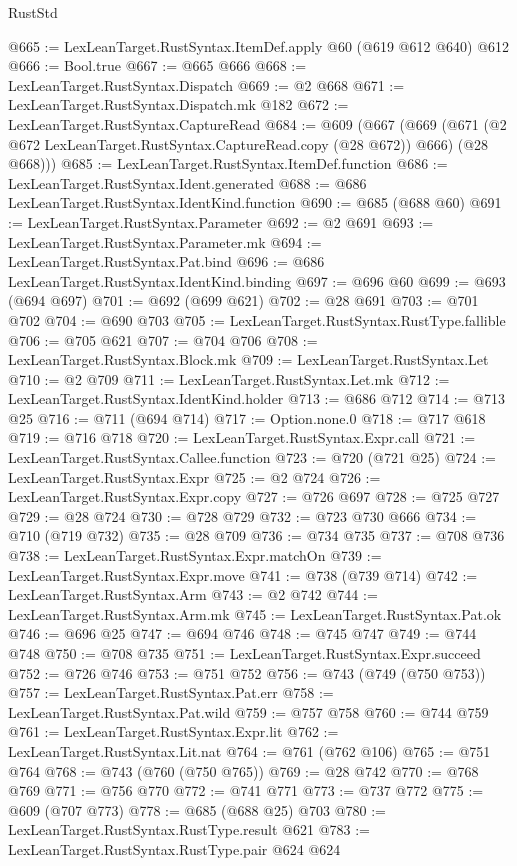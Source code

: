 \begin{lexlean}{RustStd}
\begin{coremodule}
@665 := LexLeanTarget.RustSyntax.ItemDef.apply @60 (@619 @612 @640) @612
@666 := Bool.true
@667 := @665 @666
@668 := LexLeanTarget.RustSyntax.Dispatch
@669 := @2 @668
@671 := LexLeanTarget.RustSyntax.Dispatch.mk @182
@672 := LexLeanTarget.RustSyntax.CaptureRead
@684 := @609
    (@667
      (@669 (@671 (@2 @672 LexLeanTarget.RustSyntax.CaptureRead.copy (@28 @672)) @666) (@28 @668)))
@685 := LexLeanTarget.RustSyntax.ItemDef.function
@686 := LexLeanTarget.RustSyntax.Ident.generated
@688 := @686 LexLeanTarget.RustSyntax.IdentKind.function
@690 := @685 (@688 @60)
@691 := LexLeanTarget.RustSyntax.Parameter
@692 := @2 @691
@693 := LexLeanTarget.RustSyntax.Parameter.mk
@694 := LexLeanTarget.RustSyntax.Pat.bind
@696 := @686 LexLeanTarget.RustSyntax.IdentKind.binding
@697 := @696 @60
@699 := @693 (@694 @697)
@701 := @692 (@699 @621)
@702 := @28 @691
@703 := @701 @702
@704 := @690 @703
@705 := LexLeanTarget.RustSyntax.RustType.fallible
@706 := @705 @621
@707 := @704 @706
@708 := LexLeanTarget.RustSyntax.Block.mk
@709 := LexLeanTarget.RustSyntax.Let
@710 := @2 @709
@711 := LexLeanTarget.RustSyntax.Let.mk
@712 := LexLeanTarget.RustSyntax.IdentKind.holder
@713 := @686 @712
@714 := @713 @25
@716 := @711 (@694 @714)
@717 := Option.none.{0}
@718 := @717 @618
@719 := @716 @718
@720 := LexLeanTarget.RustSyntax.Expr.call
@721 := LexLeanTarget.RustSyntax.Callee.function
@723 := @720 (@721 @25)
@724 := LexLeanTarget.RustSyntax.Expr
@725 := @2 @724
@726 := LexLeanTarget.RustSyntax.Expr.copy
@727 := @726 @697
@728 := @725 @727
@729 := @28 @724
@730 := @728 @729
@732 := @723 @730 @666
@734 := @710 (@719 @732)
@735 := @28 @709
@736 := @734 @735
@737 := @708 @736
@738 := LexLeanTarget.RustSyntax.Expr.matchOn
@739 := LexLeanTarget.RustSyntax.Expr.move
@741 := @738 (@739 @714)
@742 := LexLeanTarget.RustSyntax.Arm
@743 := @2 @742
@744 := LexLeanTarget.RustSyntax.Arm.mk
@745 := LexLeanTarget.RustSyntax.Pat.ok
@746 := @696 @25
@747 := @694 @746
@748 := @745 @747
@749 := @744 @748
@750 := @708 @735
@751 := LexLeanTarget.RustSyntax.Expr.succeed
@752 := @726 @746
@753 := @751 @752
@756 := @743 (@749 (@750 @753))
@757 := LexLeanTarget.RustSyntax.Pat.err
@758 := LexLeanTarget.RustSyntax.Pat.wild
@759 := @757 @758
@760 := @744 @759
@761 := LexLeanTarget.RustSyntax.Expr.lit
@762 := LexLeanTarget.RustSyntax.Lit.nat
@764 := @761 (@762 @106)
@765 := @751 @764
@768 := @743 (@760 (@750 @765))
@769 := @28 @742
@770 := @768 @769
@771 := @756 @770
@772 := @741 @771
@773 := @737 @772
@775 := @609 (@707 @773)
@778 := @685 (@688 @25) @703
@780 := LexLeanTarget.RustSyntax.RustType.result @621
@783 := LexLeanTarget.RustSyntax.RustType.pair @624 @624

\end{coremodule}
\end{lexlean}
